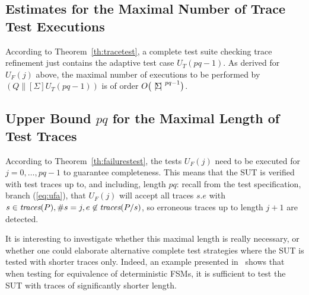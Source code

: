  
\subsection{Estimates for the Maximal Number of Trace Test Executions}

According to Theorem~\ref{th:tracetest}, a complete test suite checking trace
refinement just contains the adaptive test case $U_T(pq-1)$. As derived for
$U_F(j)$ above, the maximal number of executions to be performed by $(Q\parallel[\Sigma]
U_T(pq-1))$ is of order  $O\big({~|\! \Sigma\!|~}^{pq-1}\big)$.

\subsection{Upper Bound $pq$ for the Maximal Length of Test Traces}

According to Theorem~\ref{th:failurestest}, the tests $U_F(j)$ need to be
executed for $j = 0,\dots,pq-1$ to guarantee completeness.
 This means that the SUT is verified with test
traces up to, and including, length $pq$: recall from the test specification,
branch (\ref{eq:ufa}), that $U_F(j)$ will accept all traces $s.e$ with
$s\in\text{\it traces}(P), \#s = j, e\not\in\text{\it traces}(P/s)$, so erroneous traces up to length
$j+1$ are detected.

It is interesting to investigate whether this maximal length is really
necessary, or whether one could elaborate alternative complete test
strategies where the SUT is tested with shorter traces only. Indeed, an
example  presented in~\cite[Exercise~5]{PeleskaHuangLectureNotesMBT} shows
that when testing for equivalence of deterministic FSMs, it is sufficient to
test the SUT with traces of significantly shorter length.

